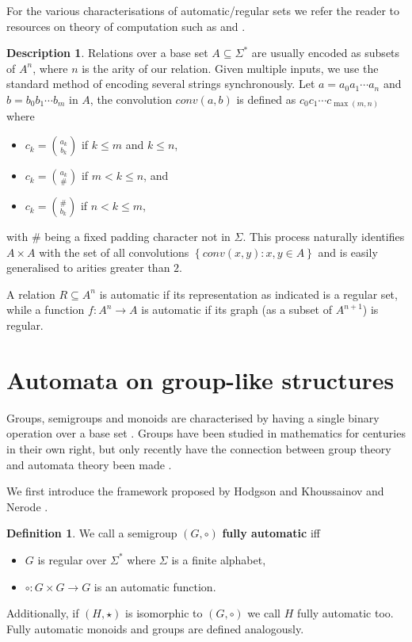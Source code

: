 \documentclass[british,a4paper,11pt,abstract=on]{scrreprt}
\theoremstyle{definition}
\newtheorem{definition}[theorem]{Definition}
\newtheorem{descr}[theorem]{Description}
\theoremstyle{remark}
\newcommand{\set}[1]{\left\{ #1 \right\}}
\begin{document}
For the various characterisations of automatic/regular sets we refer the reader to resources on theory of computation such as
\autocite{Hopcroft} and \autocite{fullautomatatheory}.

\begin{descr}
    Relations over a base set \(A\subseteq \Sigma^*\) are usually encoded as subsets of \(A^n\),
    where \(n\) is the arity of our relation. Given multiple inputs, we use the standard method of encoding several strings synchronously.
    Let \(a = a_0a_1\cdots a_n\) and \(b = b_0b_1\cdots b_m\) in \(A\), the convolution \(conv(a,b)\) is defined as
    \(c_0c_1\cdots c_{\max(m,n)}\) where
    \begin{itemize}
        \item \(c_k = \binom{a_k}{b_k}\) if \(k\leq m\) and \(k \leq n\),
        \item \(c_k = \binom{a_k}{\#}\) if \(m < k \leq n\), and
        \item \(c_k = \binom{\#}{b_k}\) if \(n < k \leq m\),
    \end{itemize}
    with \(\#\) being a fixed padding character not in \(\Sigma\).
    This process naturally identifies \(A\times A\) with the set of all convolutions \(\set{conv(x,y):x,y\in A}\) and is
    easily generalised to arities greater than \(2\).
\end{descr}
A relation \(R\subseteq A^n\) is automatic if its representation as indicated is a regular set,
while a function \(f: A^n\to A\) is automatic if its graph (as a subset of \(A^{n+1}\)) is regular.

\section{Automata on group-like structures}

Groups, semigroups and monoids are characterised by having a single binary operation over a base set \autocite{algebre}.
Groups have been studied in mathematics for centuries in their own right, but only recently have the connection between group theory and automata theory been made
\autocite{Ho76,Ho83,KN,Epstein}.

We first introduce the framework proposed by Hodgson \autocite{Ho76,Ho83} and Khoussainov and Nerode \autocite{KN}.
\begin{definition} \label{fully automatic group}
    We call a semigroup \((G,\circ)\) \textbf{fully automatic} iff
    \begin{itemize}
        \item \(G\) is regular over \(\Sigma^*\) where \(\Sigma\) is a finite alphabet,
        \item \(\circ : G\times G\to G\) is an automatic function.
    \end{itemize}
    Additionally, if \((H,\star)\) is isomorphic to \((G,\circ)\) we call \(H\) fully automatic too.
    Fully automatic monoids and groups are defined analogously.
\end{definition}
\end{document}
